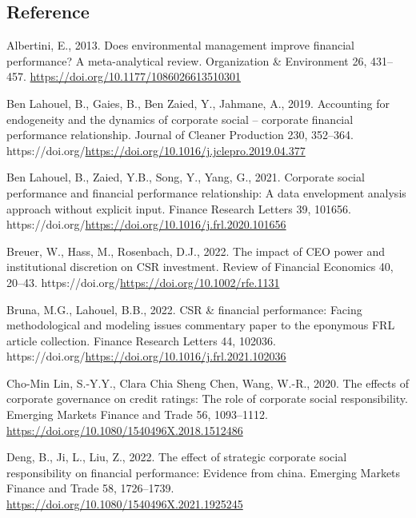 \documentclass[
  letterpaper,
  DIV=11,
  numbers=noendperiod]{scrartcl}
\newlength{\cslhangindent}
\newenvironment{CSLReferences}[2] %
 {\begin{list}{}{%
  \setlength{\itemindent}{0pt}
  \setlength{\leftmargin}{0pt}
  \setlength{\parsep}{0pt}
  \ifodd #1
   \setlength{\leftmargin}{\cslhangindent}
   \setlength{\itemindent}{-1\cslhangindent}
  \fi
  \setlength{\itemsep}{#2\baselineskip}}}
 {\end{list}}
\begin{document}
\subsection*{Reference}\label{reference}

\label{refs}
\begin{CSLReferences}{1}{0}
Albertini, E., 2013. Does environmental management improve financial
performance? A meta-analytical review. Organization \& Environment 26,
431--457. \url{https://doi.org/10.1177/1086026613510301}

Ben Lahouel, B., Gaies, B., Ben Zaied, Y., Jahmane, A., 2019. Accounting
for endogeneity and the dynamics of corporate social -- corporate
financial performance relationship. Journal of Cleaner Production 230,
352--364.
https://doi.org/\url{https://doi.org/10.1016/j.jclepro.2019.04.377}

Ben Lahouel, B., Zaied, Y.B., Song, Y., Yang, G., 2021. Corporate social
performance and financial performance relationship: A data envelopment
analysis approach without explicit input. Finance Research Letters 39,
101656. https://doi.org/\url{https://doi.org/10.1016/j.frl.2020.101656}

Breuer, W., Hass, M., Rosenbach, D.J., 2022. The impact of CEO power and
institutional discretion on CSR investment. Review of Financial
Economics 40, 20--43.
https://doi.org/\url{https://doi.org/10.1002/rfe.1131}

Bruna, M.G., Lahouel, B.B., 2022. CSR \& financial performance: Facing
methodological and modeling issues commentary paper to the eponymous FRL
article collection. Finance Research Letters 44, 102036.
https://doi.org/\url{https://doi.org/10.1016/j.frl.2021.102036}

Cho-Min Lin, S.-Y.Y., Clara Chia Sheng Chen, Wang, W.-R., 2020. The
effects of corporate governance on credit ratings: The role of corporate
social responsibility. Emerging Markets Finance and Trade 56,
1093--1112. \url{https://doi.org/10.1080/1540496X.2018.1512486}

Deng, B., Ji, L., Liu, Z., 2022. The effect of strategic corporate
social responsibility on financial performance: Evidence from china.
Emerging Markets Finance and Trade 58, 1726--1739.
\url{https://doi.org/10.1080/1540496X.2021.1925245}


\end{CSLReferences}
\end{document}
